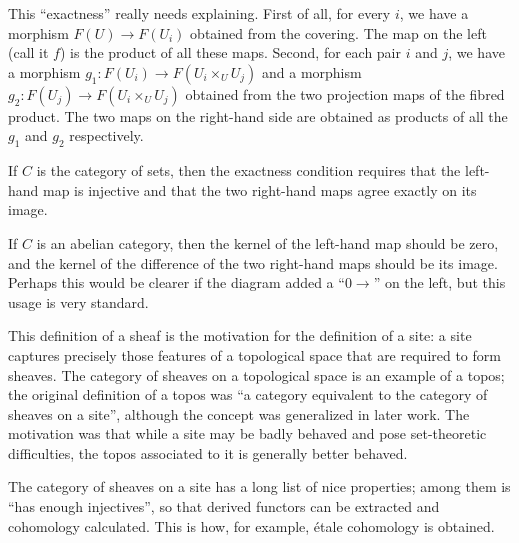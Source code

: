 \documentclass[12pt]{article}
\begin{document}
This ``exactness'' really needs explaining.  First of all, for every $i$, we have a morphism $F(U)\to F(U_i)$ obtained from the covering.  The map on the left (call it $f$) is the product of all these maps.  Second, for each pair $i$ and $j$, we have a morphism $g_1\colon F(U_i)\to F(U_i\times_U U_j)$ and a morphism $g_2\colon F(U_j)\to F(U_i\times_U U_j)$ obtained from the two projection maps of the fibred product.  The two maps on the right-hand side are obtained as products of all the $g_1$ and $g_2$ respectively. 

If $C$ is the category of sets, then the exactness condition requires that the left-hand map is injective and that the two right-hand maps agree exactly on its image.

If $C$ is an abelian category, then the kernel of the left-hand map should be zero, and the kernel of the difference of the two right-hand maps should be its image.  Perhaps this would be clearer if the diagram added a ``$0\to$'' on the left, but this usage is very standard.

This definition of a sheaf is the motivation for the definition of a site: a site captures precisely those features of a topological space that are required to form sheaves.  The category of sheaves on a topological space is an example of a topos; the original definition of a topos was ``a category equivalent to the category of sheaves on a site'', although the concept was generalized in later work.  The motivation was that while a site may be badly behaved and pose set-theoretic difficulties, the topos associated to it is generally better behaved.

The category of sheaves on a site has a long list of nice properties; among them is ``has enough injectives'', so that derived functors can be extracted and cohomology calculated.  This is how, for example, \'etale cohomology is obtained.

\begin{thebibliography}{9}



\end{thebibliography}
\end{document}
